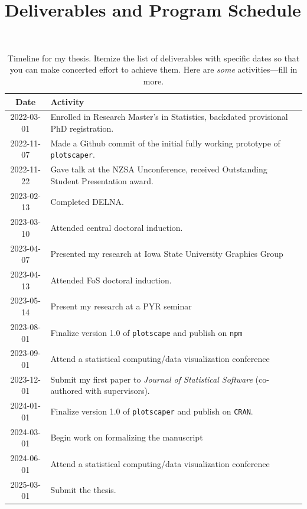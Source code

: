 \documentclass[12pt,a4paper]{article}
\begin{document}
\section{Deliverables and Program Schedule}
\label{sec:timeline}




\begin{table}[hh]
\caption{
Timeline for my thesis.
Itemize the list of deliverables with specific dates so that
you can make concerted effort to achieve them.
Here are \textit{some} activities---fill in more.
}
\centering
\ ~~~~ \\
\label{tab:timeline}
\begin{tabular}{|c|l|}
\hline
Date & Activity \\
\hline
2022-03-01 & Enrolled in Research Master's in Statistics, backdated provisional PhD registration. \\
2022-11-07 & Made a Github commit of the initial fully working prototype of \texttt{plotscaper}. \\
2022-11-22 & Gave talk at the NZSA Unconference, received Outstanding Student Presentation award. \\
2023-02-13 & Completed DELNA. \\
2023-03-10 & Attended central doctoral induction. \\
2023-04-07 & Presented my research at Iowa State University Graphics Group \\
2023-04-13 & Attended FoS doctoral induction. \\
2023-05-14 & Present my research at a PYR seminar \\
2023-08-01 & Finalize version 1.0 of \texttt{plotscape} and publish on \texttt{npm} \\
2023-09-01 & Attend a statistical computing/data visualization conference \\
2023-12-01 & Submit my first paper to \textit{Journal of Statistical Software} (co-authored with supervisors). \\
2024-01-01 & Finalize version 1.0 of \texttt{plotscaper} and publish on \texttt{CRAN}. \\
2024-03-01 & Begin work on formalizing the manuscript \\
2024-06-01 & Attend a statistical computing/data visualization conference \\
2025-03-01 & Submit the thesis. \\
\hline
\end{tabular}
\end{table}
\end{document}
